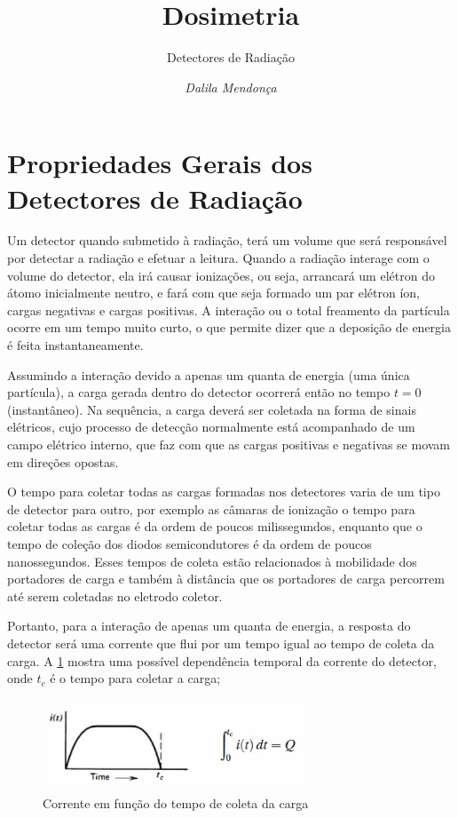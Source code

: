 \documentclass[11pt,a4paper]{article}
\title{\LobsterTwo\Huge{Dosimetria}}
\author{\LobsterTwo\Large{Detectores de Radiação\nocite{*}}}
\date{\LobsterTwo\textit{Dalila Mendonça}}
\newcounter{exemplo}
\begin{document}
	\maketitle

\section{Propriedades Gerais dos Detectores de Radiação}

    Um detector quando submetido à radiação, terá um volume que será responsável por detectar a radiação e efetuar a leitura. Quando a radiação interage com o volume do detector, ela irá causar ionizações, ou seja, arrancará um elétron do átomo inicialmente neutro, e fará com que seja formado um par elétron íon, cargas negativas e cargas positivas. A interação ou o total freamento da partícula ocorre em um tempo muito curto, o que permite dizer que a deposição de energia é feita instantaneamente. 

    Assumindo a interação devido a apenas um quanta de energia (uma única partícula), a carga gerada dentro do detector ocorrerá então no tempo $t = 0$ (instantâneo). Na sequência, a carga deverá ser coletada na forma de sinais elétricos, cujo processo de detecção normalmente está acompanhado de um campo elétrico interno, que faz com que as cargas positivas e negativas se movam em direções opostas. 

    O tempo para coletar todas as cargas formadas nos detectores varia de um tipo de detector para outro, por exemplo as câmaras de ionização o tempo para coletar todas as cargas é da ordem de poucos milissegundos, enquanto que o tempo de coleção dos  diodos semicondutores é da ordem de poucos nanossegundos. Esses tempos de coleta estão relacionados à mobilidade dos portadores de carga e também à distância que os portadores de carga percorrem até serem coletadas no eletrodo coletor.

    Portanto, para a interação de apenas um quanta de energia, a resposta do detector será uma corrente que flui por um tempo igual ao tempo de coleta da carga. A  \ref{fig:esquemaTempoColetaCorrente} mostra uma possível dependência temporal da corrente do detector, onde $t_c$ é o tempo para coletar a carga;

        \begin{figure}[h]
            \centering
            \includegraphics[width=0.7\textwidth]{Imagens/esquemaTempoColetaCorrente.jpg}
            \caption{Corrente em função do tempo de coleta da carga}
            \label{fig:esquemaTempoColetaCorrente}
        \end{figure}
\end{document}

